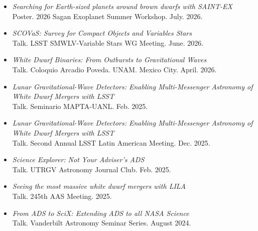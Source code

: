 \documentclass[letterpaper,10pt]{article}
\begin{document}
\begin{itemize}[label=$\blacktriangleright$]





\item \textit{Searching for Earth-sized planets around brown dwarfs with SAINT-EX} \\ Poster. 2026 Sagan Exoplanet Summer Workshop. July. 2026.



\item \textit{SCOVaS: Survey for Compact Objects and Variables Stars} \\ Talk. LSST SMWLV-Variable Stars WG Meeting. June. 2026.



\item \textit{White Dwarf Binaries: From Outbursts to Gravitational Waves} \\ Talk. Coloquio Arcadio Poveda. UNAM. Mexico City. April. 2026.

\item \textit{Lunar Gravitational-Wave Detectors: Enabling Multi-Messenger Astronomy of White Dwarf Mergers with LSST} \\ Talk. Seminario MAPTA-UANL. Feb. 2025.


\item \textit{Lunar Gravitational-Wave Detectors: Enabling Multi-Messenger Astronomy of White Dwarf Mergers with LSST} \\ Talk. Second Annual LSST Latin American Meeting. Dec. 2025.

\item \textit{Science Explorer: Not Your Adviser's ADS} \\ Talk. UTRGV Astronomy Journal Club. Feb. 2025.


\item \textit{Seeing the most massive white dwarf mergers with LILA } \\ Talk. 245th AAS Meeting. 2025.


\item \textit{From ADS to SciX: Extending ADS to all NASA Science} \\ Talk. Vanderbilt Astronomy Seminar Series. August 2024.




\end{itemize}
\end{document}
